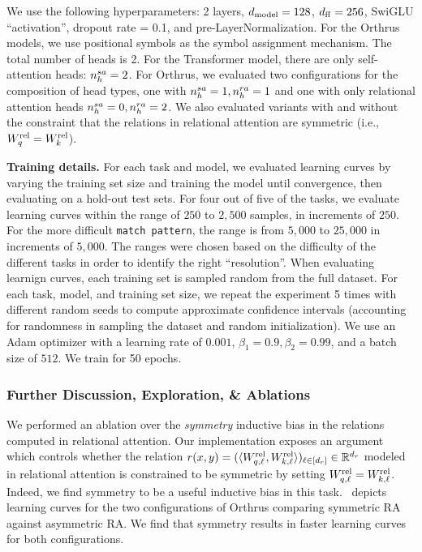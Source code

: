 We use the following hyperparameters: 2 layers, $d_{\mathrm{model}} = 128$, $d_{\mathrm{ff}} = 256$, SwiGLU ``activation'', dropout rate = 0.1, and pre-LayerNormalization. For the Orthrus models, we use positional symbols as the symbol assignment mechanism. The total number of heads is 2. For the Transformer model, there are only self-attention heads: $n_h^{sa} = 2$. For Orthrus, we evaluated two configurations for the composition of head types, one with $n_h^{sa} = 1, n_h^{ra} = 1$ and one with only relational attention heads $n_h^{sa} = 0, n_h^{ra} = 2$. We also evaluated variants with and without the constraint that the relations in relational attention are symmetric (i.e., $W_q^{\mathrm{rel}} = W_k^{\mathrm{rel}}$).

\textbf{Training details.} For each task and model, we evaluated learning curves by varying the training set size and training the model until convergence, then evaluating on a hold-out test sets. For four out of five of the tasks, we evaluate learning curves within the range of $250$ to $2,500$ samples, in increments of $250$. For the more difficult \texttt{match pattern}, the range is from $5,000$ to $25,000$ in increments of $5,000$. The ranges were chosen based on the difficulty of the different tasks in order to identify the right ``resolution''. When evaluating learnign curves, each training set is sampled random from the full dataset. For each task, model, and training set size, we repeat the experiment 5 times with different random seeds to compute approximate confidence intervals (accounting for randomness in sampling the dataset and random initialization). We use an Adam optimizer with a learning rate of $0.001$, $\beta_1 = 0.9, \beta_2 = 0.99$, and a batch size of $512$. We train for 50 epochs.

\subsubsection*{Further Discussion, Exploration, \& Ablations}

We performed an ablation over the \textit{symmetry} inductive bias in the relations computed in relational attention. Our implementation exposes an argument which controls whether the relation $r(x, y) = (\langle W_{q, \ell}^{\mathrm{rel}}, W_{k, \ell}^{\mathrm{rel}} \rangle)_{\ell \in [d_r]} \in \mathbb{R}^{d_r}$ modeled in relational attention is constrained to be symmetric by setting $W_{q, \ell}^{\mathrm{rel}} = W_{k, \ell}^{\mathrm{rel}}$. Indeed, we find symmetry to be a useful inductive bias in this task.~ depicts learning curves for the two configurations of Orthrus comparing symmetric RA against asymmetric RA. We find that symmetry results in faster learning curves for both configurations.

